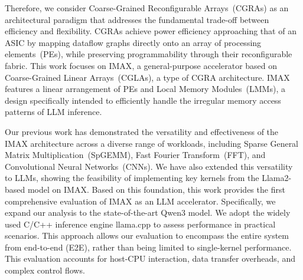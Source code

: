 Therefore, we consider Coarse-Grained Reconfigurable Arrays~(CGRAs) as an architectural paradigm that addresses the fundamental trade-off between efficiency and flexibility.
CGRAs achieve power efficiency approaching that of an ASIC by mapping dataflow graphs directly onto an array of processing elements~(PEs), while preserving programmability through their reconfigurable fabric.
This work focuses on IMAX\nobreak\cite{imax3}, a general-purpose accelerator based on Coarse-Grained Linear Arrays~(CGLAs), a type of CGRA architecture.
IMAX features a linear arrangement of PEs and Local Memory Modules~(LMMs), a design specifically intended to efficiently handle the irregular memory access patterns of LLM inference. 


Our previous work has demonstrated the versatility and effectiveness of the IMAX architecture across a diverse range of workloads, including Sparse General Matrix Multiplication~(SpGEMM), Fast Fourier Transform~(FFT), and Convolutional Neural Networks~(CNNs)\nobreak\cite{imax3,cnn_imax_1,cnn_imax_2}. 
We have also extended this versatility to LLMs, showing the feasibility of implementing key kernels from the Llama2-based model on IMAX\nobreak\cite{first_llm_imax,llama2_imax}. 
Based on this foundation, this work provides the first comprehensive evaluation of IMAX as an LLM accelerator.
Specifically, we expand our analysis to the state-of-the-art Qwen3 model\nobreak\cite{yang2025qwen3technicalreport,qwen}. 
We adopt the widely used C/C++ inference engine llama.cpp\nobreak\cite{llama.cpp} to assess performance in practical scenarios.
This approach allows our evaluation to encompass the entire system from end-to-end (E2E), rather than being limited to single-kernel performance.
This evaluation accounts for host-CPU interaction, data transfer overheads, and complex control flows.

